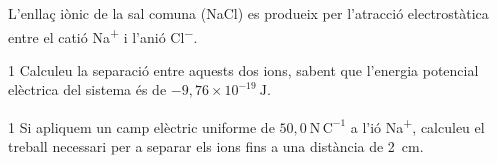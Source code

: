 L'enllaç iònic de la sal comuna (NaCl) es produeix per l'atracció electrostàtica entre el catió Na\textsuperscript{+} i l'anió Cl\textsuperscript{$-$}.


\begin{apartat}{1}
Calculeu la separació entre aquests dos ions, sabent que l'energia potencial elèctrica del sistema és de $-9,76\times 10^{-19}\ \mathrm{J}$.
\end{apartat}

\begin{apartat}{1}
Si apliquem un camp elèctric uniforme de $50,0\ \mathrm{N\,C^{-1}}$ a l'ió Na\textsuperscript{+}, calculeu el treball necessari per a separar els ions fins a una distància de 2~cm.
\end{apartat}

